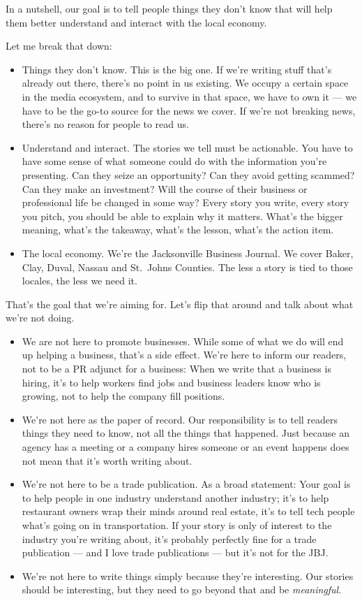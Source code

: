 \documentclass[
  12pt,
  american,
  letterpaperpaper,
  extrafontsizes,onecolumn,openright
  ]{memoir}
\providecommand{\tightlist}{%
  \setlength{\itemsep}{0pt}\setlength{\parskip}{0pt}}
\newlength{\rf}
\begin{document}
In a nutshell, our goal is to tell people things they don't know that will help them better understand and interact with the local economy.

Let me break that down:

\begin{itemize}
\tightlist
\item
  Things they don't know. This is the big one. If we're writing stuff that's already out there, there's no point in us existing. We occupy a certain space in the media ecosystem, and to survive in that space, we have to own it --- we have to be the go-to source for the news we cover. If we're not breaking news, there's no reason for people to read us.
\item
  Understand and interact. The stories we tell must be actionable. You have to have some sense of what someone could do with the information you're presenting. Can they seize an opportunity? Can they avoid getting scammed? Can they make an investment? Will the course of their business or professional life be changed in some way? Every story you write, every story you pitch, you should be able to explain why it matters. What's the bigger meaning, what's the takeaway, what's the lesson, what's the action item.
\item
  The local economy. We're the Jacksonville Business Journal. We cover Baker, Clay, Duval, Nassau and St.~Johns Counties. The less a story is tied to those locales, the less we need it.
\end{itemize}

That's the goal that we're aiming for. Let's flip that around and talk about what we're not doing.

\begin{itemize}
\tightlist
\item
  We are not here to promote businesses. While some of what we do will end up helping a business, that's a side effect. We're here to inform our readers, not to be a PR adjunct for a business: When we write that a business is hiring, it's to help workers find jobs and business leaders know who is growing, not to help the company fill positions.
\item
  We're not here as the paper of record. Our responsibility is to tell readers things they need to know, not all the things that happened. Just because an agency has a meeting or a company hires someone or an event happens does not mean that it's worth writing about.
\item
  We're not here to be a trade publication. As a broad statement: Your goal is to help people in one industry understand another industry; it's to help restaurant owners wrap their minds around real estate, it's to tell tech people what's going on in transportation. If your story is only of interest to the industry you're writing about, it's probably perfectly fine for a trade publication --- and I love trade publications --- but it's not for the JBJ.
\item
  We're not here to write things simply because they're interesting. Our stories should be interesting, but they need to go beyond that and be \emph{meaningful}.
\end{itemize}
\end{document}
